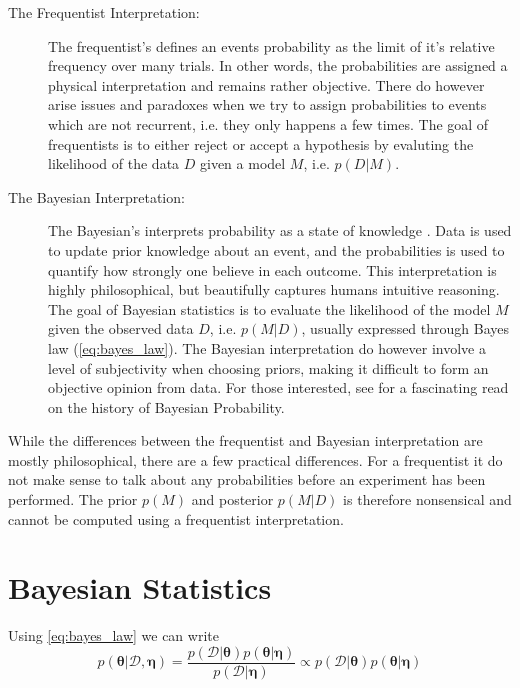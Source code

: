 \begin{description}
    \item[The Frequentist Interpretation:] The frequentist's defines an events probability as the limit of it's relative frequency over many trials. In other words, the probabilities are assigned a physical interpretation and remains rather objective. There do however arise issues and paradoxes when we try to assign probabilities to events which are not recurrent, i.e. they only happens a few times. The goal of frequentists is to either reject or accept a hypothesis by evaluting the likelihood of the data $D$ given a model $M$, i.e. $p(D | M)$. 
    \item[The Bayesian Interpretation:] The Bayesian's interprets probability as a state of knowledge \cite{Jaynes86bayesianmethods:}. Data is used to update prior knowledge about an event, and the probabilities is used to quantify how strongly one believe in each outcome. This interpretation is highly philosophical, but beautifully captures humans intuitive reasoning. The goal of Bayesian statistics is to evaluate the likelihood of the model $M$ given the observed data $D$, i.e. $p(M | D)$, usually expressed through Bayes law (\cref{eq:bayes_law}). The Bayesian interpretation do however involve a level of subjectivity when choosing priors, making it difficult to form an objective opinion from data. For those interested, see \Cite{Jaynes86bayesianmethods:} for a fascinating read on the history of Bayesian Probability.
\end{description}

While the differences between the frequentist and Bayesian interpretation are mostly philosophical, there are a few practical differences. For a frequentist it do not make sense to talk about any probabilities before an experiment has been performed. The prior $p(M)$ and posterior $p(M | D)$ is therefore nonsensical and cannot be computed using a frequentist interpretation.     





\section{Bayesian Statistics}

Using \cref{eq:bayes_law} we can write 
\begin{equation}\label{eq:bayes_learning}
    p(\boldsymbol{\theta}| \mathcal{D}, \boldsymbol{\eta}) = \frac{p(\mathcal{D} | \boldsymbol{\theta}) p(\boldsymbol{\theta} | \boldsymbol{\eta})}{p(\mathcal{D} | \boldsymbol{\eta})} \propto p(\mathcal{D} | \boldsymbol{\theta})p(\boldsymbol{\theta} | \boldsymbol{\eta})
\end{equation}

